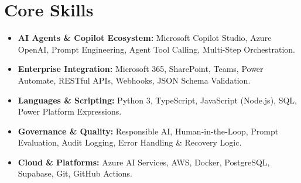 \documentclass[a4paper,10pt]{article}
\begin{document}
\section{Core Skills}
\begin{itemize}
  \item \textbf{AI Agents \& Copilot Ecosystem:} Microsoft Copilot Studio, Azure OpenAI, Prompt Engineering, Agent Tool Calling, Multi-Step Orchestration.
  \item \textbf{Enterprise Integration:} Microsoft 365, SharePoint, Teams, Power Automate, RESTful APIs, Webhooks, JSON Schema Validation.
  \item \textbf{Languages \& Scripting:} Python 3, TypeScript, JavaScript (Node.js), SQL, Power Platform Expressions.
  \item \textbf{Governance \& Quality:} Responsible AI, Human-in-the-Loop, Prompt Evaluation, Audit Logging, Error Handling \& Recovery Logic.
  \item \textbf{Cloud \& Platforms:} Azure AI Services, AWS, Docker, PostgreSQL, Supabase, Git, GitHub Actions.
\end{itemize}
\end{document}
